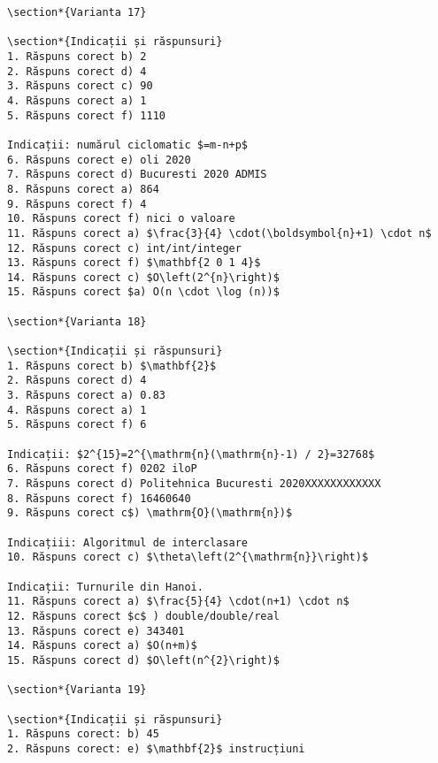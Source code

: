 \begin{verbatim}
\section*{Varianta 17}

\section*{Indicații și răspunsuri}
1. Răspuns corect b) 2
2. Răspuns corect d) 4
3. Răspuns corect c) 90
4. Răspuns corect a) 1
5. Răspuns corect f) 1110

Indicații: numărul ciclomatic $=m-n+p$
6. Răspuns corect e) oli 2020
7. Răspuns corect d) Bucuresti 2020 ADMIS
8. Răspuns corect a) 864
9. Răspuns corect f) 4
10. Răspuns corect f) nici o valoare
11. Răspuns corect a) $\frac{3}{4} \cdot(\boldsymbol{n}+1) \cdot n$
12. Răspuns corect c) int/int/integer
13. Răspuns corect f) $\mathbf{2 0 1 4}$
14. Răspuns corect c) $O\left(2^{n}\right)$
15. Răspuns corect $a) O(n \cdot \log (n))$

\section*{Varianta 18}

\section*{Indicații și răspunsuri}
1. Răspuns corect b) $\mathbf{2}$
2. Răspuns corect d) 4
3. Răspuns corect a) 0.83
4. Răspuns corect a) 1
5. Răspuns corect f) 6

Indicații: $2^{15}=2^{\mathrm{n}(\mathrm{n}-1) / 2}=32768$
6. Răspuns corect f) 0202 iloP
7. Răspuns corect d) Politehnica Bucuresti 2020XXXXXXXXXXXX
8. Răspuns corect f) 16460640
9. Răspuns corect c$) \mathrm{O}(\mathrm{n})$

Indicațiii: Algoritmul de interclasare
10. Răspuns corect c) $\theta\left(2^{\mathrm{n}}\right)$

Indicații: Turnurile din Hanoi.
11. Răspuns corect a) $\frac{5}{4} \cdot(n+1) \cdot n$
12. Răspuns corect $c$ ) double/double/real
13. Răspuns corect e) 343401
14. Răspuns corect a) $O(n+m)$
15. Răspuns corect d) $O\left(n^{2}\right)$

\section*{Varianta 19}

\section*{Indicații și răspunsuri}
1. Răspuns corect: b) 45
2. Răspuns corect: e) $\mathbf{2}$ instrucțiuni


\end{verbatim}
